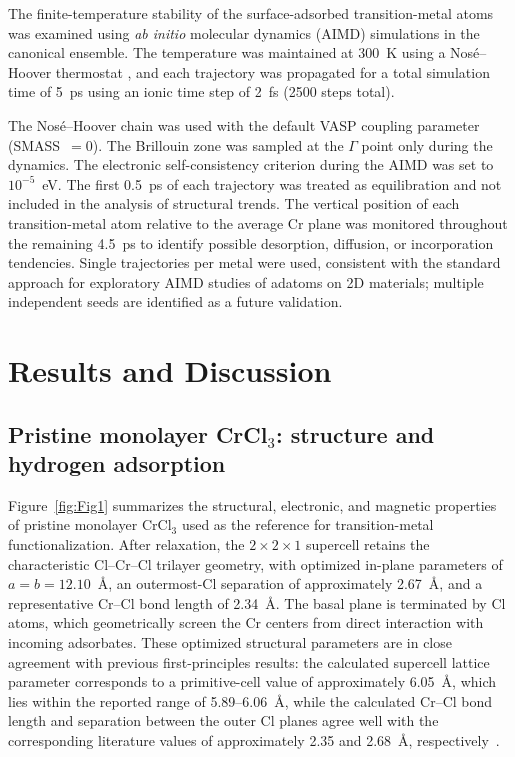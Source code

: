 \documentclass[journal=jacsat,manuscript=article]{achemso}
\begin{document}
The finite-temperature stability of the surface-adsorbed transition-metal atoms was examined using \textit{ab initio} molecular dynamics (AIMD) simulations in the canonical ensemble. The temperature was maintained at 300~K using a Nosé--Hoover thermostat \cite{Nose1984,Hoover1985}, and each trajectory was propagated for a total simulation time of 5~ps using an ionic time step of 2~fs (2500 steps total). {\color{revcolor}%
  The Nosé--Hoover chain was used with the default VASP coupling parameter (SMASS~$=0$). The Brillouin zone was sampled at the $\Gamma$ point only during the dynamics. The electronic self-consistency criterion during the AIMD was set to $10^{-5}$~eV. The first 0.5~ps of each trajectory was treated as equilibration and not included in the analysis of structural trends. The vertical position of each transition-metal atom relative to the average Cr plane was monitored throughout the remaining 4.5~ps to identify possible desorption, diffusion, or incorporation tendencies. Single trajectories per metal were used, consistent with the standard approach for exploratory AIMD studies of adatoms on 2D materials; multiple independent seeds are identified as a future validation.
\par}

\section{Results and Discussion}

\subsection{Pristine monolayer CrCl$_3$: structure and hydrogen adsorption}

\noindent Figure~\ref{fig:Fig1} summarizes the structural, electronic, and magnetic properties of pristine monolayer CrCl$_3$ used as the reference for transition-metal functionalization. After relaxation, the $2\times2 \times 1$ supercell retains the characteristic Cl--Cr--Cl trilayer geometry, with optimized in-plane parameters of $a=b=12.10$~\AA, an outermost-Cl separation of approximately 2.67~\AA, and a representative Cr--Cl bond length of 2.34~\AA. The basal plane is terminated by Cl atoms, which geometrically screen the Cr centers from direct interaction with incoming adsorbates. These optimized structural parameters are in close agreement with previous first-principles results: the calculated supercell lattice parameter corresponds to a primitive-cell value of approximately 6.05~\AA, which lies within the reported range of 5.89--6.06~\AA, while the calculated Cr--Cl bond length and separation between the outer Cl planes agree well with the corresponding literature values of approximately 2.35 and 2.68~\AA, respectively~\cite{Webster2018,Gao2018,Mastrippolito2022,Zala2024}.
\end{document}
